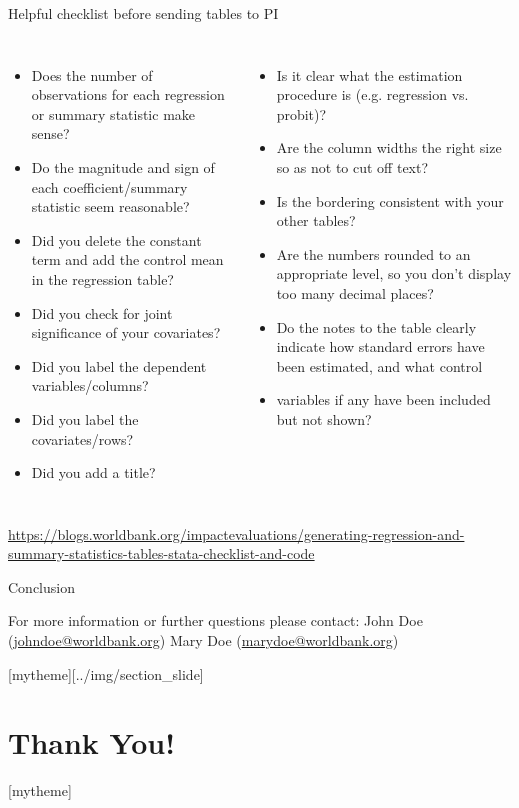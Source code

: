 \documentclass[aspectratio=169]{beamer}
\newcommand{\sectionpic}[2]{
	\setbeamertemplate{section page}[mytheme][#2]
	\section{#1}
	\setbeamertemplate{section page}[mytheme]
}
\begin{document}
\begin{frame}[fragile]{Helpful checklist before sending tables to PI}
	\begin{columns}[t]
		\begin{itemize}
			\item \scriptsize Does the number of observations for each regression or summary statistic make sense?
			\item \scriptsize Do the magnitude and sign of each coefficient/summary statistic seem reasonable?
			\item \scriptsize Did you delete the constant term and add the control mean in the regression table?
			\item \scriptsize Did you check for joint significance of your covariates?
			\item \scriptsize Did you label the dependent variables/columns?
			\item \scriptsize Did you label the covariates/rows?
			\item \scriptsize Did you add a title?
		\end{itemize}
		\begin{itemize}
			\item \scriptsize Is it clear what the estimation procedure is (e.g. regression vs. probit)?
			\item \scriptsize Are the column widths the right size so as not to cut off text?
			\item \scriptsize Is the bordering consistent with your other tables?
			\item \scriptsize Are the numbers rounded to an appropriate level, so you don’t display too many decimal places?
			\item \scriptsize Do the notes to the table clearly indicate how standard errors have been estimated, and what control \item variables if any have been included but not shown?
		\end{itemize}
	\end{columns}
	\vspace{.1cm}
	\scriptsize  \url{https://blogs.worldbank.org/impactevaluations/generating-regression-and-summary-statistics-tables-stata-checklist-and-code}
\end{frame}

\begin{frame}{Conclusion}


\vspace{20mm}
For more information or further questions please contact:
\newline John Doe (\url{johndoe@worldbank.org}) \newline Mary Doe (\url{marydoe@worldbank.org})

\end{frame}

\sectionpic{Thank You!}{../img/section_slide}
\end{document}
